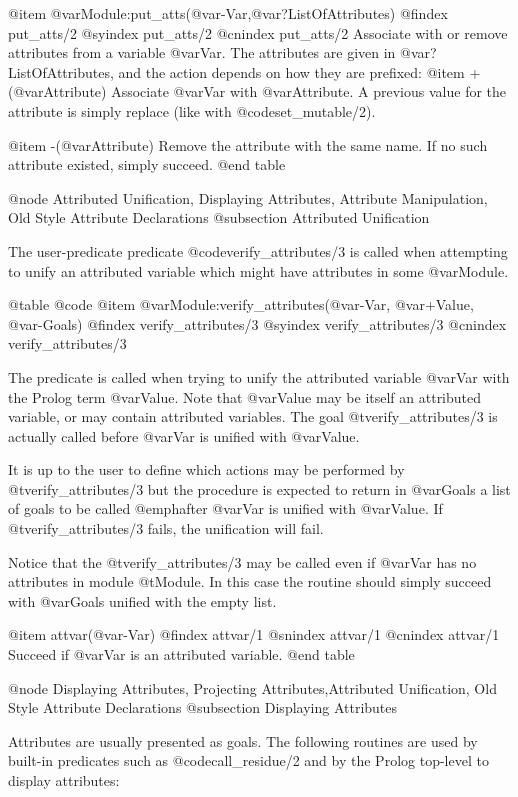 {{{{{{{{{@item @var{Module}:put_atts(@var{-Var},@var{?ListOfAttributes})
@findex put_atts/2
@syindex put_atts/2
@cnindex put_atts/2
Associate with or remove attributes from a variable @var{Var}. The
attributes are given in @var{?ListOfAttributes}, and the action depends
on how they are prefixed:
@item +(@var{Attribute})
Associate @var{Var} with @var{Attribute}. A previous value for the
attribute is simply replace (like with @code{set_mutable/2}).

@item -(@var{Attribute})
Remove the attribute with the same name. If no such attribute existed,
simply succeed.
@end table

@node Attributed Unification, Displaying Attributes, Attribute Manipulation, Old Style Attribute Declarations
@subsection Attributed Unification

The user-predicate predicate @code{verify_attributes/3} is called when
attempting to unify an attributed variable which might have attributes
in some @var{Module}.

@table @code
@item @var{Module}:verify_attributes(@var{-Var}, @var{+Value}, @var{-Goals})
@findex verify_attributes/3
@syindex verify_attributes/3
@cnindex verify_attributes/3

The predicate is called when trying to unify the attributed variable
@var{Var} with the Prolog term @var{Value}. Note that @var{Value} may be
itself an attributed variable, or may contain attributed variables.  The
goal @t{verify_attributes/3} is actually called before @var{Var} is
unified with @var{Value}.

It is up to the user to define which actions may be performed by
@t{verify_attributes/3} but the procedure is expected to return in
@var{Goals} a list of goals to be called @emph{after} @var{Var} is
unified with @var{Value}. If @t{verify_attributes/3} fails, the
unification will fail.

Notice that the @t{verify_attributes/3} may be called even if @var{Var}
has no attributes in module @t{Module}. In this case the routine should
simply succeed with @var{Goals} unified with the empty list.

@item attvar(@var{-Var})
@findex attvar/1
@snindex attvar/1
@cnindex attvar/1
Succeed if @var{Var} is an attributed variable.
@end table



@node Displaying Attributes, Projecting Attributes,Attributed Unification, Old Style Attribute Declarations 
@subsection Displaying Attributes

Attributes are usually presented as goals. The following routines are
used by built-in predicates such as @code{call_residue/2} and by the
Prolog top-level to display attributes:

}}}}}}}}}
